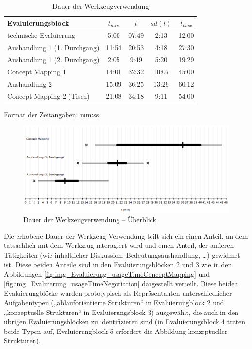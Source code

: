 \begin{table}[htbp]
	\centering
	\caption{Dauer der Werkzeugverwendung}
		\begin{tabular}{| l || c | c | c | c |}
		\hline
			Evaluierungsblock & $t_{min}$ & $\overline{t}$ & $sd(t)$ & $t_{max}$ \\ \hline
			technische Evaluierung		  &  5:00 & 07:49 &  2:13 & 12:00 \\
			Aushandlung 1 (1. Durchgang)  & 11:54 & 20:53 &  4:18 & 27:30 \\
			Aushandlung 1 (2. Durchgang)  &  2:05 &  9:49 &  5:20 & 19:29 \\
			Concept Mapping 1			  & 14:01 & 32:32 & 10:07 & 45:00 \\
			Aushandlung 2				  & 15:09 & 36:25 & 13:29 & 60:12 \\
			Concept Mapping 2 (Tisch)     & 21:08 & 34:18 &  9:11 & 54:00 \\  \hline
	\end{tabular}
	\footnotesize Format der Zeitangaben: mm:ss
	\label{tab:dauer_werkzeugverwendung}
\end{table}


\begin{figure}[htbp]
	\centering
		\includegraphics[width=15cm]{img/Evaluierung/usageTimeOverview.png}
	\caption{Dauer der Werkzeugverwendung -- Überblick}
	\label{fig:img_Evaluierung_usageTimeOverview}
\end{figure}

Die erhobene Dauer der Werkzeug-Verwendung teilt sich ein einen Anteil, an dem tatsächlich mit dem Werkzeug interagiert wird und einen Anteil, der anderen Tätigkeiten (wie inhaltlicher Diskussion, Bedeutungsaushandlung, \ldots) gewidmet ist. Diese beiden Anteile sind in den Evaluierungsblöcken 2 und 3 wie in den Abbildungen \ref{fig:img_Evaluierung_usageTimeConceptMapping} und \ref{fig:img_Evaluierung_usageTimeNegotiation} dargestellt verteilt. Diese beiden Evaluierungblöcke wurden prototypisch als Repräsentanten unterschiedlicher Aufgabentypen („ablauforientierte Strukturen“ in Evaluierungblock 2 und „konzeptuelle Strukturen“ in Evaluierungsblock 3) ausgewählt, die auch in den übrigen Evaluierungsblöcken zu identifizieren sind (in Evaluierungsblock 4 traten beide Typen auf, Evaluierungblock 5 erfordert die Abbildung konzeptueller Strukturen).

